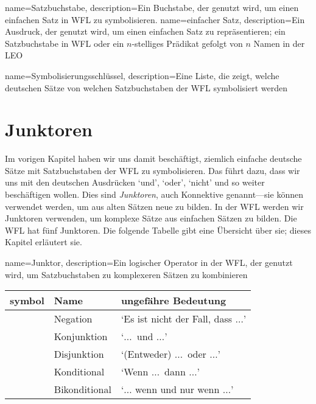 {
name=Satzbuchstabe,
description={Ein Buchstabe, der genutzt wird, um einen einfachen Satz in WFL zu symbolisieren.}
}
{
name=einfacher Satz,
description={Ein Ausdruck, der genutzt wird, um einen einfachen Satz zu repräsentieren; ein Satzbuchstabe in WFL oder ein $n$-stelliges Prädikat gefolgt von $n$ Namen in der LEO}
}

{
name=Symbolisierungsschlüssel,
description={Eine Liste, die zeigt, welche deutschen Sätze von welchen \gls{Satzbuchstabe}n der WFL symbolisiert werden}
}

\chapter{Junktoren}
\label{s:TFLConnectives}

Im vorigen Kapitel haben wir uns damit beschäftigt, ziemlich einfache deutsche Sätze mit Satzbuchstaben der WFL zu symbolisieren. Das führt dazu, dass wir uns mit den deutschen Ausdrücken `und', `oder', `nicht' und so weiter beschäftigen wollen. Dies sind \emph{Junktoren}, auch Konnektive genannt---sie können verwendet werden, um aus alten Sätzen neue zu bilden. In der WFL werden wir Junktoren verwenden, um komplexe Sätze aus einfachen Sätzen zu bilden. Die WFL hat fünf Junktoren. Die folgende Tabelle gibt eine Übersicht über sie; dieses Kapitel erläutert sie.

{
name=Junktor,
description={Ein logischer Operator in der WFL, der genutzt wird, um \gls{Satzbuchstabe}n zu komplexeren Sätzen zu kombinieren}
}
	\begin{table}[h]
	\center
	\begin{tabular}{l l l}
	
	\textbf{symbol}&\textbf{Name}&\textbf{ungefähre Bedeutung}\\
	\hline
	\enot&Negation&`Es ist nicht der Fall, dass $\ldots$'\\
	\eand&Konjunktion&`$\ldots$\ und $\ldots$'\\
	\eor&Disjunktion&`(Entweder) $\ldots$\ oder $\ldots$'\\ %
	\eif&Konditional&`Wenn $\ldots$\ dann $\ldots$'\\
	\eiff&Bikonditional&`$\ldots$ wenn und nur wenn $\ldots$'\\
	
	\end{tabular}
	\end{table}

